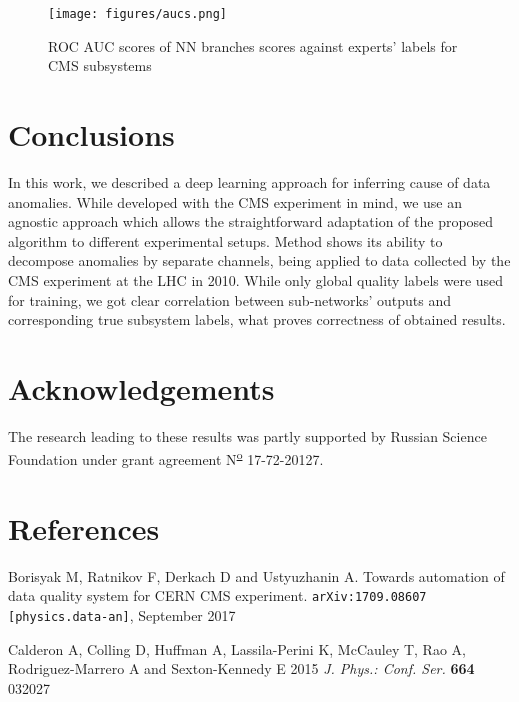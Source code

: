 \documentclass[a4paper]{jpconf}
\begin{document}
\begin{figure}[H]
\begin{center}
\texttt{[image: figures/aucs.png]}
\end{center}
\caption{\label{label}ROC AUC scores of NN branches scores against experts' labels for CMS subsystems}
\end{figure}



\section{Conclusions}
In this work, we described a deep learning approach for inferring cause of data anomalies. While developed
with the CMS experiment in mind, we use an agnostic approach which allows the straightforward
adaptation of the proposed algorithm to different experimental setups. Method shows its ability to decompose anomalies by separate channels, being applied to data collected by the CMS experiment at the LHC in 2010. While only global quality labels were used for training, we got clear correlation between sub-networks’ outputs and corresponding true subsystem labels, what proves correctness of obtained results.

\section{Acknowledgements}
The research leading to these results was partly supported by Russian Science Foundation under grant agreement N\textsuperscript{\underline{\scriptsize o}} 17-72-20127.

\section*{References}
\begin{thebibliography}{2}
\item Borisyak M, Ratnikov F, Derkach D and Ustyuzhanin A. Towards automation of data quality system for CERN CMS experiment. {\tt arXiv:1709.08607 [physics.data-an]}, September 2017

\item  Calderon A, Colling D, Huffman A, Lassila-Perini K, McCauley T, Rao A, Rodriguez-Marrero A and Sexton-Kennedy E 2015 {\it J. Phys.: Conf. Ser.} {\bf 664} 032027
\end{thebibliography}
\end{document}
